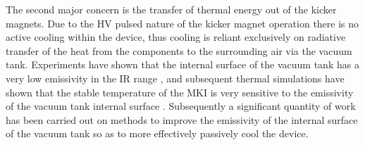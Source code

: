 The second major concern is the transfer of thermal energy out of the kicker magnets. Due to the HV pulsed nature of the kicker magnet operation there is no active cooling within the device, thus cooling is reliant exclusively on radiative transfer of the heat from the components to the surrounding air via the vacuum tank. Experiments have shown that the internal surface of the vacuum tank has a very low emissivity in the IR range \cite{Barnes:emisMKI}, and subsequent thermal simulations have shown that the stable temperature of the MKI is very sensitive to the emissivity of the vacuum tank internal surface \cite{Garlasche:2dHeatEmis}. Subsequently a significant quantity of work has been carried out on methods to improve the emissivity of the internal surface of the vacuum tank so as to more effectively passively cool the device.